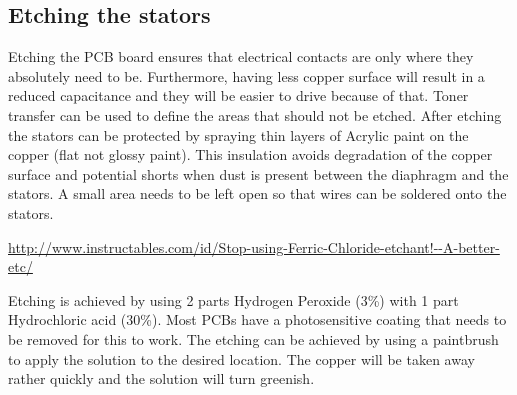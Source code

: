 \documentclass{article}
\begin{document}
%
%
%
%

\subsection{Etching the stators}
\label{s:driver:etching}
Etching the PCB board ensures that electrical contacts are only where they absolutely need to be. Furthermore, having less copper surface will result in a reduced capacitance and they will be easier to drive because of that. Toner transfer can be used to define the areas that should not be etched. After etching the stators can be protected by spraying thin layers of Acrylic paint on the copper (flat not glossy paint). This insulation avoids degradation of the copper surface and potential shorts when dust is present between the diaphragm and the stators. A small area needs to be left open so that wires can be soldered onto the stators.

\url{http://www.instructables.com/id/Stop-using-Ferric-Chloride-etchant!--A-better-etc/}

Etching is achieved by using 2 parts Hydrogen Peroxide (3\%) with 1 part Hydrochloric acid (30\%). Most PCBs have a photosensitive coating that needs to be removed for this to work. The etching can be achieved by using a paintbrush to apply the solution to the desired location. The copper will be taken away rather quickly and the solution will turn greenish.
\end{document}
